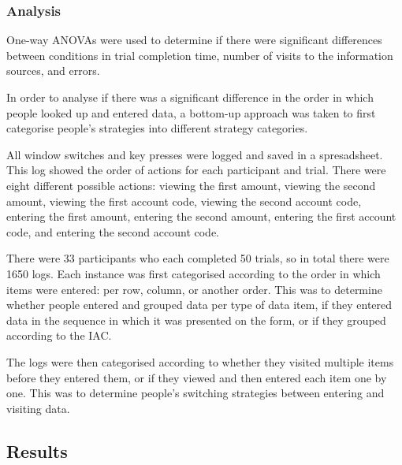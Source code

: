 \begin{table}
\begin{enumerate}
\subsubsection{Analysis}
One-way ANOVAs were used to determine if there were significant differences between conditions in trial completion time, number of visits to the information sources, and errors. 

In order to analyse if there was a significant difference in the order in which people looked up and entered data, a bottom-up approach was taken to first categorise people's strategies into different strategy categories.

All window switches and key presses were logged and saved in a spresadsheet. This log showed the order of actions for each participant and trial. There were eight different possible actions: viewing the first amount, viewing the second amount, viewing the first account code, viewing the second account code, entering the first amount, entering the second amount, entering the first account code, and entering the second account code.

There were 33 participants who each completed 50 trials, so in total there were 1650 logs. Each instance was first categorised according to the order in which items were entered: per row, column, or another order. This was to determine whether people entered and grouped data per type of data item, if they entered data in the sequence in which it was presented on the form, or if they grouped according to the IAC.

The logs were then categorised according to whether they visited multiple items before they entered them, or if they viewed and then entered each item one by one. This was to determine people's switching strategies between entering and visiting data. 

\subsection{Results}


\end{enumerate}
\end{table}
